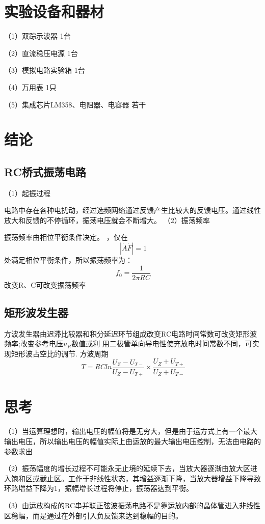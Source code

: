 \documentclass{article}
\begin{document}
	\section{ 实验设备和器材}
	（1）双踪示波器             \qquad \qquad \qquad \qquad \qquad  \qquad           1台\par
	（2）直流稳压电源             \qquad \quad \qquad \qquad \qquad \qquad           1台\par
	（3）模拟电路实验箱            \qquad  \qquad \qquad \qquad\qquad                1台\par
	（4）万用表                   \qquad  \qquad \qquad \qquad \qquad \qquad \qquad  1只\par
	（5）集成芯片LM358、电阻器、电容器  \quad                                        若干

\section{结论}
\subsection{RC桥式振荡电路}
（1）起振过程\par
电路中存在各种电扰动，经过选频网络通过反馈产生比较大的反馈电压。通过线性放大和反馈的不停循环，振荡电压就会不断增大。
（2）振荡频率\par
振荡频率由相位平衡条件决定。
，仅在\begin{equation*}
  \ |\dot{A}\dot{F}|=1
  \end{equation*}
处满足相位平衡条件，所以振荡频率为：
 \begin{equation*}
  \ f_0=\frac{1}{2\pi RC}
  \end{equation*}
改变R、C可改变振荡频率

\subsection{矩形波发生器}
方波发生器由迟滞比较器和积分延迟环节组成改变RC电路时间常数可改变矩形波频率;改变参考电压$u_R$数值或利
用二极管单向导电性使充放电时间常数不同，可实现矩形波占空比的调节. 方波周期
\begin{equation*}
    \ T=RCln\frac{U_Z-U_{T-}}{U_Z-U_{T+}}\times \frac{U_Z+U_{T+}}{U_Z+U_{T-}}
\end{equation*}
\section{思考}
（1）当运算理想时，输出电压的幅值将是无穷大，但是由于运方式上有一个最大输出电压，所以输出电压的幅值实际上由运放的最大输出电压控制，无法由电路的参数求出\par
（2）振荡幅度的增长过程不可能永无止境的延续下去，当放大器逐渐由放大区进入饱和区或截止区。工作于非线性状态，其增益逐渐下降，当放大器增益下降导致环路增益下降为1，振幅增长过程将停止，振荡器达到平衡。\par
（3）由运放构成的RC串并联正弦波振荡电路不是靠运放内部的晶体管进入非线性区稳幅，而是通过在外部引入负反馈来达到稳幅的目的。 \par
\end{document}
